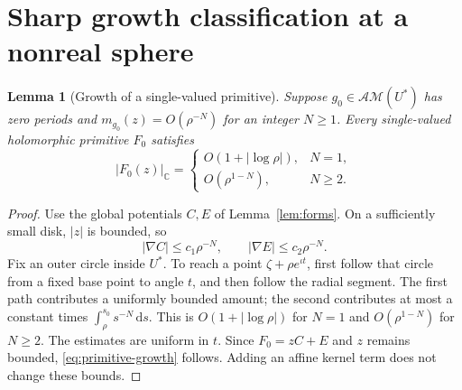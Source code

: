 \documentclass[11pt,a4paper]{article}
\numberwithin{equation}{section}
\newtheorem{lemma}[theorem]{Lemma}
\theoremstyle{definition}
\theoremstyle{remark}
\newcommand{\C}{\mathbb C}
\newcommand{\AM}{\mathcal{AM}}
\newcommand{\dd}{\,\mathrm d}
\newcommand{\cnorm}[1]{\lvert #1\rvert_{\C}}
\begin{document}
\section{Sharp growth classification at a nonreal sphere}
\label{sec:growth}

\begin{lemma}[Growth of a single-valued primitive]\label{lem:growth-inverse}
Suppose $g_0\in\AM(U^*)$ has zero periods and
$m_{g_0}(z)=O(\rho^{-N})$ for an integer $N\ge1$.
Every single-valued holomorphic primitive $F_0$ satisfies
\begin{equation}\label{eq:primitive-growth}
 \cnorm{F_0(z)}=
 \begin{cases}
 O(1+|\log\rho|),&N=1,\\
 O(\rho^{1-N}),&N\ge2.
 \end{cases}
\end{equation}
\end{lemma}
\begin{proof}
Use the global potentials $C,E$ of Lemma~\ref{lem:forms}.
On a sufficiently small disk, $|z|$ is bounded, so
\[
 |\nabla C|\le c_1\rho^{-N},\qquad
 |\nabla E|\le c_2\rho^{-N}.
\]
Fix an outer circle inside $U^*$. To reach a point $\zeta+\rho e^{\iota t}$,
first follow that circle from a fixed base point to angle $t$, and then
follow the radial segment. The first path contributes a uniformly bounded
amount; the second contributes at most a constant times
$\int_\rho^{s_0}s^{-N}\dd s$.
This is $O(1+|\log\rho|)$ for $N=1$ and $O(\rho^{1-N})$ for $N\ge2$.
The estimates are uniform in $t$. Since $F_0=zC+E$ and $z$ remains
bounded, \eqref{eq:primitive-growth} follows. Adding an affine kernel
term does not change these bounds.
\end{proof}
\end{document}
